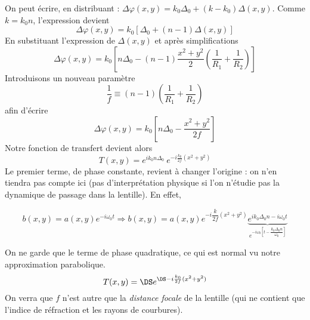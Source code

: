 	On peut écrire, en distribuant : $\Delta\varphi(x,y) = k_0\Delta_0 + (k-k_0)\Delta(x,y)$. Comme 
	$k=k_0n$, l'expression devient
	\begin{equation}
	\Delta\varphi(x,y) = k_0\left[\Delta_0+(n-1)\Delta(x,y)\right]
	\end{equation}
	En substituant l'expression de $\Delta(x,y)$ et après simplifications
	\begin{equation}
	\Delta \varphi(x,y) = k_0\left[n\Delta_0-(n-1)\dfrac{x^2+y^2}{2}\left(\dfrac{1}{R_1}+\dfrac{1}{R_2}\right)
	\right]
	\end{equation}
	Introduisons un nouveau paramètre
	\begin{equation}
	\frac{1}{f} \equiv (n-1)\left(\dfrac{1}{R_1}+\dfrac{1}{R_2}\right)
	\end{equation}
	afin d'écrire
	\begin{equation}
	\Delta\varphi(x,y) = k_0\left[n\Delta_0 - \dfrac{x^2+y^2}{2f}\right]
	\end{equation}
	Notre fonction de transfert devient alors
	\begin{equation}
	T(x,y) = e^{ik_0 n\Delta_0}\ e^{-i\frac{k_0}{2f}(x^2+y^2)}
	\end{equation}
	Le premier terme, de phase constante, revient à changer l'origine : on n'en tiendra pas compte ici (pas 
	d'interprétation physique si l'on n'étudie pas la dynamique de passage dans la lentille).
	En effet,
	
	\begin{equation}
	b(x,y)= a(x,y) e^{-i\omega_0 t} \Rightarrow b(x,y) = a(x,y) e^{-i\dfrac{k}{2f}(x^2+y^2)} \underbrace{e^{ik_0\Delta_0 n -i\omega_0t}}_{e^{-i\omega_0\left[t-\dfrac{k_0\Delta_0 n}{\omega_0}\right]}}
	\end{equation}
	
	On ne garde 
	que le terme de phase quadratique, ce qui est normal vu notre approximation parabolique. 
	\begin{equation}
	T(x,y) =\DS e^{\DS -i\frac{k_0}{2f}(x^2+y^2)}
	\end{equation}
	On verra que $f$ n'est autre que la \textit{distance focale} de la lentille (qui ne contient que l'indice de 
	réfraction et les rayons de courbures).

\newpage
